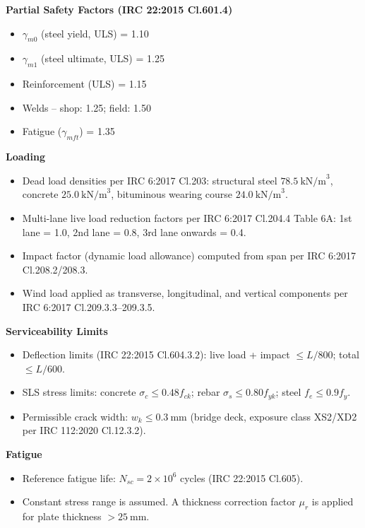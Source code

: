 \documentclass[12pt,a4paper]{report}
\numberwithin{table}{chapter}
\numberwithin{figure}{chapter}
\begin{document}
\textbf{Partial Safety Factors (IRC 22:2015 Cl.601.4)}

\begin{itemize}
\item $\gamma_{m0}$ (steel yield, ULS) = 1.10
\item $\gamma_{m1}$ (steel ultimate, ULS) = 1.25
\item Reinforcement (ULS) = 1.15
\item Welds -- shop: 1.25; field: 1.50
\item Fatigue ($\gamma_{mft}$) = 1.35
\end{itemize}

\textbf{Loading}

\begin{itemize}
\item Dead load densities per IRC 6:2017 Cl.203: structural steel $78.5 \ \text{kN/m}^3$, concrete $25.0 \ \text{kN/m}^3$, bituminous wearing course $24.0 \ \text{kN/m}^3$.
\item Multi-lane live load reduction factors per IRC 6:2017 Cl.204.4 Table 6A: 1st lane = 1.0, 2nd lane = 0.8, 3rd lane onwards = 0.4.
\item Impact factor (dynamic load allowance) computed from span per IRC 6:2017 Cl.208.2/208.3.
\item Wind load applied as transverse, longitudinal, and vertical components per IRC 6:2017 Cl.209.3.3--209.3.5.
\end{itemize}

\textbf{Serviceability Limits}

\begin{itemize}
\item Deflection limits (IRC 22:2015 Cl.604.3.2): live load + impact $\leq L/800$; total $\leq L/600$.
\item SLS stress limits: concrete $\sigma_c \leq 0.48 f_{ck}$; rebar $\sigma_s \leq 0.80 f_{yk}$; steel $f_e \leq 0.9 f_y$.
\item Permissible crack width: $w_k \leq 0.3 \ \text{mm}$ (bridge deck, exposure class XS2/XD2 per IRC 112:2020 Cl.12.3.2).
\end{itemize}

\textbf{Fatigue}

\begin{itemize}
\item Reference fatigue life: $N_{sc} = 2 \times 10^6$ cycles (IRC 22:2015 Cl.605).
\item Constant stress range is assumed. A thickness correction factor $\mu_r$ is applied for plate thickness $> 25 \ \text{mm}$.
\end{itemize}
\end{document}
